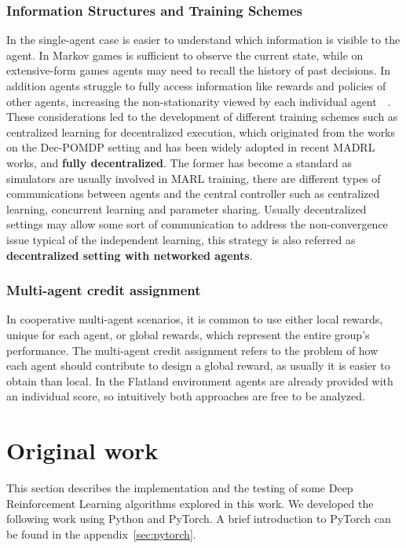 \documentclass[11pt, a4paper, hidelinks]{report}
\begin{document}
\subsection{Information Structures and Training Schemes}\label{subsec:information-structures-and-training-schemes}
In the single-agent case is easier to understand which information is visible to the agent.
In Markov games is sufficient to observe the current state, while on extensive-form games agents may need to recall the history of past decisions.
In addition agents struggle to fully access information like rewards and policies of other agents, increasing the non-stationarity viewed by each individual agent~\citep{Nguyen-2020}~\citep{zhang2019multiagent}.
These considerations led to the development of different training schemes such as centralized learning for decentralized execution, which originated from the works on the Dec-POMDP setting and has been widely adopted in recent MADRL works, and \textbf{fully decentralized}.
The former has become a standard as simulators are usually involved in MARL training, there are different types of communications between agents and the central controller such as centralized learning, concurrent learning and parameter sharing\citep{Nguyen-2020}.
Usually decentralized settings may allow some sort of communication to address the non-convergence issue typical of the independent learning, this strategy is also referred as \textbf{decentralized setting with networked agents}.

\subsection{Multi-agent credit assignment}\label{subsec:multi-agent-credit-assignment}
In cooperative multi-agent scenarios, it is common to use either local rewards, unique for each agent, or global rewards, which represent the entire group’s performance.
The multi-agent credit assignment refers to the problem of how each agent should contribute to design a global reward, as usually it is easier to obtain than local.
In the Flatland environment agents are already provided with an individual score, so intuitively both approaches are free to be analyzed.

\chapter{Original work}\label{ch:original-work}

This section describes the implementation and the testing of some Deep Reinforcement Learning algorithms explored in this work.
We developed the following work using Python and PyTorch.
A brief introduction to PyTorch can be found in the appendix~\ref{sec:pytorch}.
\end{document}
